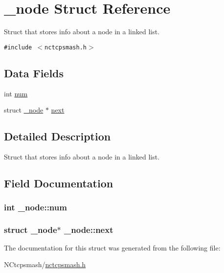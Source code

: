 \hypertarget{struct__node}{
\section{\_\-node Struct Reference}
\label{struct__node}
}
Struct that stores info about a node in a linked list.  


{\tt \#include $<$nctcpsmash.h$>$}

\subsection*{Data Fields}
\begin{CompactItemize}
\item 
int \hyperlink{struct__node_1317d4cf2625f6a0afd7765295e84d1e}{num}
\item 
struct \hyperlink{struct__node}{\_\-node} $\ast$ \hyperlink{struct__node_1cf2f32ddf62dd25aeefd2fa32701663}{next}
\end{CompactItemize}


\subsection{Detailed Description}
Struct that stores info about a node in a linked list. 

\subsection{Field Documentation}
\hypertarget{struct__node_1317d4cf2625f6a0afd7765295e84d1e}{
\subsubsection{\setlength{\rightskip}{0pt plus 5cm}int {\bf \_\-node::num}}}
\label{struct__node_1317d4cf2625f6a0afd7765295e84d1e}


\hypertarget{struct__node_1cf2f32ddf62dd25aeefd2fa32701663}{
\subsubsection{\setlength{\rightskip}{0pt plus 5cm}struct {\bf \_\-node}$\ast$ {\bf \_\-node::next}}}
\label{struct__node_1cf2f32ddf62dd25aeefd2fa32701663}




The documentation for this struct was generated from the following file:\begin{CompactItemize}
\item 
NCtcpsmash/\hyperlink{nctcpsmash_8h}{nctcpsmash.h}\end{CompactItemize}
